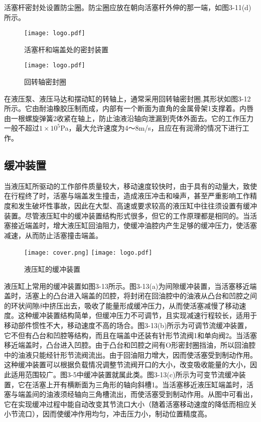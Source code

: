 活塞杆密封处设置防尘圈。防尘圈应放在朝向活塞杆外伸的那一端，如图3-11(d)所示。
\begin{figure}[htbp]
\begin{minipage}[t]{0.45\linewidth}
\centering
\texttt{[image: logo.pdf]}
\caption{活塞杆和端盖处的密封装置}
\end{minipage}
\begin{minipage}[t]{0.45\linewidth}
\centering
\texttt{[image: logo.pdf]}
\caption{回转轴密封圈}
\end{minipage}
\end{figure}

在液压泵、液压马达和摆动缸的转轴上，通常采用回转轴密封圈,其形状如图3-12所示。它由耐油橡胶压制而成，内部有一个断面为直角的金属骨架1支撑着。内唇由一根螺旋弹簧2收紧在轴上，防止油液沿轴向泄漏到壳体外面去。它的工作压力一般不超过$1\times10^5$Pa，最大允许速度为4～8m/s，且应在有润滑的情况下进行工作。
\subsection{缓冲装置}
    当液压缸所驱动的工作部件质量较大，移动速度较快时，由于具有的动量大，致使在行程终了时，活塞与端盖发生撞击，造成液压冲击和噪声，甚至严重影响工作精度和发生破坏性事故，因此在大型、高速或要求较高的液压缸中往往须设置有缓冲装置。尽管液压缸中的缓冲装置结构形式很多，但它的工作原理都是相同的。当活塞接近端盖时，增大液压缸回油阻力，使缓冲油腔内产生足够的缓冲压力，使活塞减速，从而防止活塞撞击端盖。
\begin{figure}[htbp]
\centering
\ifOpenSource
\texttt{[image: cover.png]}
\else
\texttt{[image: logo.pdf]}
\fi
\caption{液压缸的缓冲装置}
\label{logo}
\end{figure}
    液压缸上常用的缓冲装置如图3-13所示。图3-13(a)为间隙缓冲装置，当活塞移近端盖时，活塞上的凸台进入端盖的凹腔，将封闭在回油腔中的油液从凸台和凹腔之间的环状间隙$\delta$中挤压出去，吸收了能量形成缓冲压力，从而使活塞减慢了移动速度。这种缓冲装置结构简单，但缓冲压力不可调节，且实现减速行程较长，适用于移动部件惯性不大，移动速度不高的场合。图3-13(b)所示为可调节流缓冲装置，它不但有凸台和凹腔等结构，而且在端盖中还装有针形节流阀1和单向阀2。当活塞移近端盖时，凸台进入凹腔。由于凸台和凹腔之间有O形密封圈挡油，所以回油腔中的油液只能经针形节流阀流出。由于回油阻力增大，因而使活塞受到制动作用。这种缓冲装置可以根据负载情况调整节流阀开口的大小，改变吸收能量的大小，因此适用范围较广。图3-5中缓冲装置就属此类。图3-13(c)所示为可变节流缓冲装置，它在活塞上开有横断面为三角形的轴向斜槽1。当活塞移近液压缸端盖时，活塞与端盖间的油液须经轴向三角槽流出，而使活塞受到制动作用。从图中可看出，它在实现缓冲过程中能自动改变其节流口大小（随着活塞移动速度的降低而相应关小节流口），因而使缓冲作用均匀，冲击压力小，制动位置精度高。
